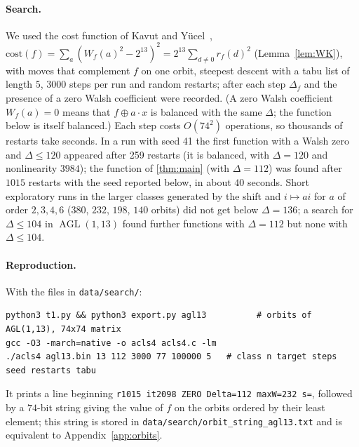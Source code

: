 \documentclass[11pt]{article}
\numberwithin{equation}{section}
\theoremstyle{definition}
\theoremstyle{remark}
\DeclareMathOperator{\AGL}{AGL}
\begin{document}
\paragraph{Search.} We used the cost function of Kavut and Y\"ucel~\cite{KY03,KMY07},
$\mathrm{cost}(f)=\sum_a(W_f(a)^2-2^{13})^2=2^{13}\sum_{d\ne0}r_f(d)^2$ (Lemma~\ref{lem:WK}), with
moves that complement $f$ on one orbit, steepest descent with a tabu list of length $5$, $3000$ steps
per run and random restarts; after each step $\Delta_f$ and the presence of a zero Walsh coefficient were
recorded. (A zero Walsh coefficient $W_f(a)=0$ means that $f\oplus a\cdot x$ is balanced with the same
$\Delta$; the function below is itself balanced.) Each step costs $O(74^2)$ operations, so thousands of
restarts take seconds. In a run with seed 41 the first function with a Walsh zero and $\Delta\le 120$ appeared after 259
restarts (it is balanced, with $\Delta=120$ and nonlinearity $3984$); the function of \cref{thm:main}
(with $\Delta=112$) was found after $1015$ restarts with the seed reported below, in about $40$ seconds.
Short exploratory runs in the larger classes generated by the shift and $i\mapsto ai$ for $a$ of order
$2,3,4,6$ ($380$, $232$, $198$, $140$ orbits) did not get below $\Delta=136$; a search for
$\Delta\le104$ in $\AGL(1,13)$ found further functions with $\Delta=112$ but none with $\Delta\le 104$.

\paragraph{Reproduction.} With the files in \texttt{data/search/}:
\begin{lstlisting}
python3 t1.py && python3 export.py agl13          # orbits of AGL(1,13), 74x74 matrix
gcc -O3 -march=native -o acls4 acls4.c -lm
./acls4 agl13.bin 13 112 3000 77 100000 5   # class n target steps seed restarts tabu
\end{lstlisting}
It prints a line beginning \texttt{r1015 it2098 ZERO Delta=112 maxW=232 s=}, followed by a $74$-bit string
giving the value of $f$ on the orbits ordered by their least element; this string is stored in
\texttt{data/search/orbit\_string\_agl13.txt} and is equivalent to Appendix~\ref{app:orbits}.
\end{document}

